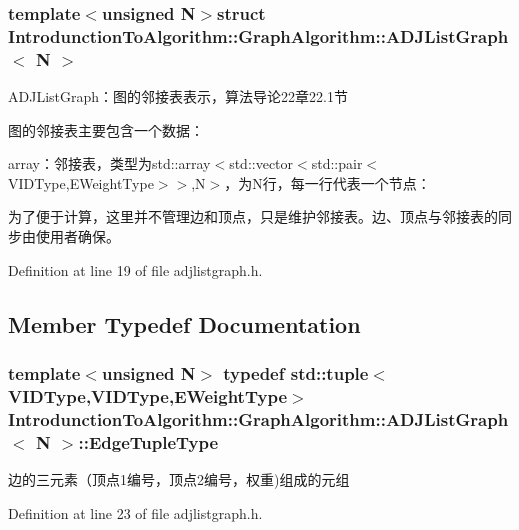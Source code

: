 \subsubsection*{template$<$unsigned N$>$struct Introdunction\+To\+Algorithm\+::\+Graph\+Algorithm\+::\+A\+D\+J\+List\+Graph$<$ N $>$}

A\+D\+J\+List\+Graph：图的邻接表表示，算法导论22章22.1节 

图的邻接表主要包含一个数据：


\begin{DoxyItemize}
\item {\ttfamily array}：邻接表，类型为{\ttfamily std\+::array$<$std\+::vector$<$std\+::pair$<$V\+I\+D\+Type,E\+Weight\+Type$>$$>$,N$>$}，为{\ttfamily N}行，每一行代表一个节点：
\end{DoxyItemize}

为了便于计算，这里并不管理边和顶点，只是维护邻接表。边、顶点与邻接表的同步由使用者确保。 

Definition at line 19 of file adjlistgraph.\+h.



\subsection{Member Typedef Documentation}
\hypertarget{struct_introdunction_to_algorithm_1_1_graph_algorithm_1_1_a_d_j_list_graph_ad84ed29dc772f53561f644c091dd642e}{}
\subsubsection[{Edge\+Tuple\+Type}]{\setlength{\rightskip}{0pt plus 5cm}template$<$unsigned N$>$ typedef std\+::tuple$<${\bf V\+I\+D\+Type},{\bf V\+I\+D\+Type},{\bf E\+Weight\+Type}$>$ {\bf Introdunction\+To\+Algorithm\+::\+Graph\+Algorithm\+::\+A\+D\+J\+List\+Graph}$<$ N $>$\+::{\bf Edge\+Tuple\+Type}}\label{struct_introdunction_to_algorithm_1_1_graph_algorithm_1_1_a_d_j_list_graph_ad84ed29dc772f53561f644c091dd642e}
边的三元素（顶点1编号，顶点2编号，权重)组成的元组 

Definition at line 23 of file adjlistgraph.\+h.

